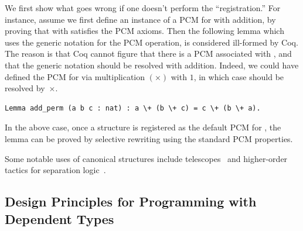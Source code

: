 We first show what goes wrong if one doesn't perform the
``registration.''  For instance, assume we first define an instance of
a PCM for  with addition, by proving that \code{+} with
 satisfies the PCM axioms.  Then the following lemma which
uses the generic notation \code{\\+} for the PCM operation, is
considered ill-formed by Coq. The reason is that Coq cannot figure
that there is a PCM associated with , and that the generic
notation \code{\\+} should be resolved with addition. Indeed, we could
have defined the PCM for  via multiplication $(\times)$ with
$1$, in which case \code{\\+} should be resolved by~$\times$.
%
\begin{lstlisting}
Lemma add_perm (a b c : nat) : a \+ (b \+ c) = c \+ (b \+ a).
\end{lstlisting}
%
In the above case, once a structure is registered as the default PCM
for , the  lemma can be proved by selective
rewriting using the standard PCM properties.

Some notable uses of canonical structures include telescopes~\citep{Garillot-al:TPHOL09} and
higher-order tactics for separation logic~\citep{Gonthier2011}.

\subsection{Design Principles for Programming with Dependent Types}

